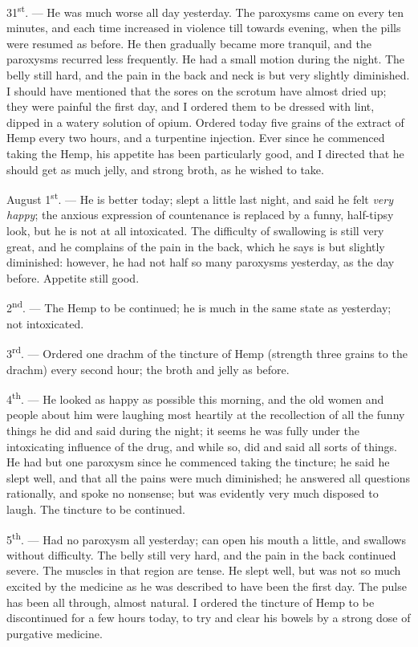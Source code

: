 \documentclass[a4paper, 11pt, oneside, polutonikogreek, english]{article}
\begin{document}
31\textsuperscript{st}. --- He was much worse all day yesterday. The paroxysms came on every ten minutes, and each time increased in violence till towards evening, when the pills were resumed as before. He then gradually became more tranquil, and the paroxysms recurred less frequently. He had a small motion during the night. The belly still hard, and the pain in the back and neck is but very slightly diminished. I should have mentioned that the sores on the scrotum have almost dried up; they were painful the first day, and I ordered them to be dressed with lint, dipped in a watery solution of opium. Ordered today five grains of the extract of Hemp every two hours, and a turpentine injection. Ever since he commenced taking the Hemp, his appetite has been particularly good, and I directed that he should get as much jelly, and strong broth, as he wished to take.

August 1\textsuperscript{st}. --- He is better today; slept a little last night, and said he felt \emph{very happy}; the anxious expression of countenance is replaced by a funny, half-tipsy look, but he is not at all intoxicated. The difficulty of swallowing is still very great, and he complains of the pain in the back, which he says is but slightly diminished: however, he had not half so many paroxysms yesterday, as the day before. Appetite still good.

2\textsuperscript{nd}. --- The Hemp to be continued; he is much in the same state as yesterday; not intoxicated.

3\textsuperscript{rd}. --- Ordered one drachm of the tincture of Hemp (strength three grains to the drachm) every second hour; the broth and jelly as before.

4\textsuperscript{th}. --- He looked as happy as possible this morning, and the old women and people about him were laughing most heartily at the recollection of all the funny things he did and said during the night; it seems he was fully under the intoxicating influence of the drug, and while so, did and said all sorts of things. He had but one paroxysm since he commenced taking the tincture; he said he slept well, and that all the pains were much diminished; he answered all questions rationally, and spoke no nonsense; but was evidently very much disposed to laugh. The tincture to be continued.

5\textsuperscript{th}. --- Had no paroxysm all yesterday; can open his mouth a little, and swallows without difficulty. The belly still very hard, and the pain in the back continued severe. The muscles in that region are tense. He slept well, but was not so much excited by the medicine as he was described to have been the first day. The pulse has been all through, almost natural. I ordered the tincture of Hemp to be discontinued for a few hours today, to try and clear his bowels by a strong dose of purgative medicine.
\end{document}
